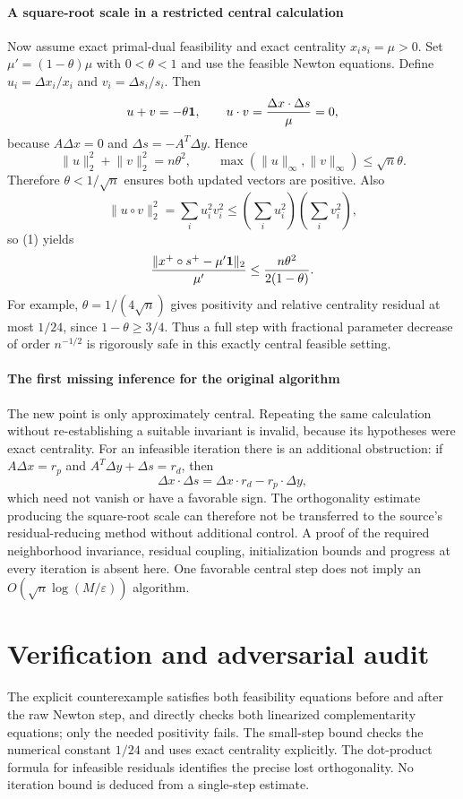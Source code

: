 \documentclass[11pt]{article}
\begin{document}
\paragraph{A square-root scale in a restricted central calculation}
Now assume exact primal-dual feasibility and exact centrality $x_is_i=\mu>0$. Set $\mu'=(1-\theta)\mu$ with $0<\theta<1$ and use the feasible Newton equations. Define $u_i=\Delta x_i/x_i$ and $v_i=\Delta s_i/s_i$. Then
\[
 u+v=-\theta{\bf1},\qquad
 u\cdot v=\frac{\Delta x\cdot\Delta s}{\mu}=0,
\]
because $A\Delta x=0$ and $\Delta s=-A^T\Delta y$. Hence
\[
 \lVert u\rVert_2^2+\lVert v\rVert_2^2=n\theta^2,
 \qquad \max(\lVert u\rVert_\infty,\lVert v\rVert_\infty)\leq\sqrt n\theta.
\]
Therefore $\theta<1/\sqrt n$ ensures both updated vectors are positive. Also
\[
 \lVert u\circ v\rVert_2^2=\sum_i u_i^2v_i^2
 \leq\left(\sum_i u_i^2\right)\left(\sum_i v_i^2\right),
\]
so (1) yields
\[
 \frac{\lVert x^+\circ s^+-\mu'{\bf1}\rVert_2}{\mu'}
 \leq\frac{n\theta^2}{2(1-\theta)}.
\]
For example, $\theta=1/(4\sqrt n)$ gives positivity and relative centrality residual at most $1/24$, since $1-\theta\geq3/4$. Thus a full step with fractional parameter decrease of order $n^{-1/2}$ is rigorously safe in this exactly central feasible setting.

\paragraph{The first missing inference for the original algorithm}
The new point is only approximately central. Repeating the same calculation without re-establishing a suitable invariant is invalid, because its hypotheses were exact centrality. For an infeasible iteration there is an additional obstruction: if $A\Delta x=r_p$ and $A^T\Delta y+\Delta s=r_d$, then
\[
 \Delta x\cdot\Delta s=\Delta x\cdot r_d-r_p\cdot\Delta y,
\]
which need not vanish or have a favorable sign. The orthogonality estimate producing the square-root scale can therefore not be transferred to the source's residual-reducing method without additional control. A proof of the required neighborhood invariance, residual coupling, initialization bounds and progress at every iteration is absent here. One favorable central step does not imply an $O(\sqrt n\log(M/\varepsilon))$ algorithm.

\section{Verification and adversarial audit}
The explicit counterexample satisfies both feasibility equations before and after the raw Newton step, and directly checks both linearized complementarity equations; only the needed positivity fails. The small-step bound checks the numerical constant $1/24$ and uses exact centrality explicitly. The dot-product formula for infeasible residuals identifies the precise lost orthogonality. No iteration bound is deduced from a single-step estimate.
\end{document}
